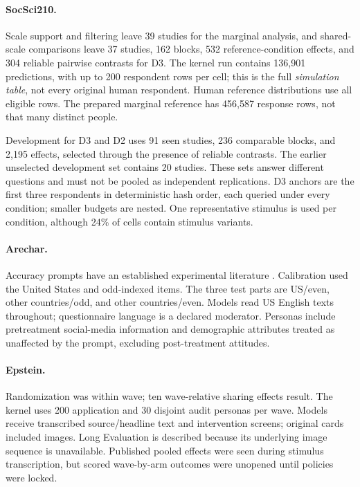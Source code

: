 \documentclass[11pt]{article}
\begin{document}
\paragraph{SocSci210.}
Scale support and filtering leave 39 studies for the marginal analysis, and shared-scale comparisons leave 37 studies, 162 blocks, 532 reference-condition effects, and 304 reliable pairwise contrasts for D3. The kernel run contains 136,901 predictions, with up to 200 respondent rows per cell; this is the full \emph{simulation table}, not every original human respondent. Human reference distributions use all eligible rows. The prepared marginal reference has 456,587 response rows, not that many distinct people.

Development for D3 and D2 uses 91 seen studies, 236 comparable blocks, and 2,195 effects, selected through the presence of reliable contrasts. The earlier unselected development set contains 20 studies. These sets answer different questions and must not be pooled as independent replications. D3 anchors are the first three respondents in deterministic hash order, each queried under every condition; smaller budgets are nested. One representative stimulus is used per condition, although 24\% of cells contain stimulus variants.

\paragraph{Arechar.}
Accuracy prompts have an established experimental literature \citep{pennycook2021}. Calibration used the United States and odd-indexed items. The three test parts are US/even, other countries/odd, and other countries/even. Models read US English texts throughout; questionnaire language is a declared moderator. Personas include pretreatment social-media information and demographic attributes treated as unaffected by the prompt, excluding post-treatment attitudes.

\paragraph{Epstein.}
Randomization was within wave; ten wave-relative sharing effects result. The kernel uses 200 application and 30 disjoint audit personas per wave. Models receive transcribed source/headline text and intervention screens; original cards included images. Long Evaluation is described because its underlying image sequence is unavailable. Published pooled effects were seen during stimulus transcription, but scored wave-by-arm outcomes were unopened until policies were locked.
\end{document}
